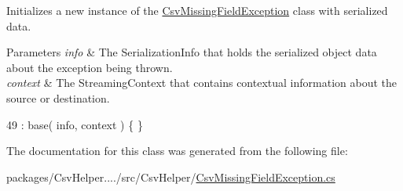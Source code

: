 Initializes a new instance of the \hyperlink{a00047}{Csv\-Missing\-Field\-Exception} class with serialized data. 


\begin{DoxyParams}{Parameters}
{\em info} & The Serialization\-Info that holds the serialized object data about the exception being thrown.\\
\hline
{\em context} & The Streaming\-Context that contains contextual information about the source or destination.\\
\hline
\end{DoxyParams}

\begin{DoxyCode}
49 : base( info, context ) \{ \}
\end{DoxyCode}


The documentation for this class was generated from the following file\-:\begin{DoxyCompactItemize}
\item 
packages/\-Csv\-Helper..../src/\-Csv\-Helper/\hyperlink{a00200}{Csv\-Missing\-Field\-Exception.\-cs}\end{DoxyCompactItemize}
